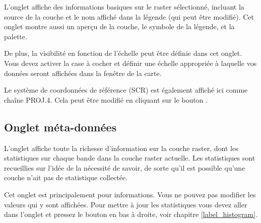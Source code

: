 L'onglet  affiche des informations basiques sur le raster
sélectionné, incluant la source de la couche et le nom affiché dans la légende (qui peut être modifié). Cet onglet montre aussi un aperçu de la couche, le symbole de la légende, et la palette.

De plus, la visibilité en fonction de l'échelle peut être définie dans cet
onglet. Vous devez activer la case à cocher et définir une échelle appropriée à laquelle vos données seront affichées dans la fenêtre de la carte.

Le système de coordonnées de référence (SCR) est également affiché ici comme chaîne PROJ.4. Cela peut être modifié en cliquant sur le bouton .

\subsection{Onglet méta-données}\label{label_metatab}

L'onglet  affiche toute la richesse d'information sur la
couche raster, dont les statistiques sur chaque bande dans la couche raster actuelle. Les statistiques sont recueillies sur l'idée de la nécessité de savoir, de sorte qu'il est possible qu'une couche n'ait pas de statistique collectée. 

Cet onglet est principalement pour informations. Vous ne pouvez pas modifier les valeurs qui y sont affichées. Pour mettre à jour les statistiques vous devez aller dans l'onglet  et pressez le bouton
 en bas à droite, voir chapitre \ref{label_histogram}.

